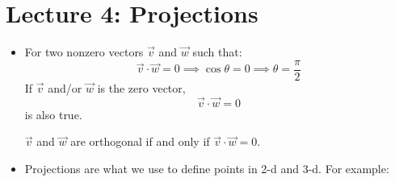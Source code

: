 \section{Lecture 4: Projections}
\begin{itemize}
    \item For two nonzero vectors $\vec{v}$ and $\vec{w}$ such that:
    \begin{equation}
        \vec{v}\cdot\vec{w}=0\implies \cos\theta=0\implies \theta=\frac{\pi}{2}
        \label{eq:}
    \end{equation}
    If $\vec{v}$ and/or $\vec{w}$ is the zero vector,
    \begin{equation}
        \vec{v}\cdot\vec{w}=0
        \label{eq:}
    \end{equation}
    is also true.
    \begin{definition}
        $\vec{v}$ and $\vec{w}$ are orthogonal if and only if $\vec{v}\cdot\vec{w}=0$.
    \end{definition}
    \item Projections are what we use to define points in 2-d and 3-d. For example:
    \begin{center}
\end{center}
\end{itemize}

